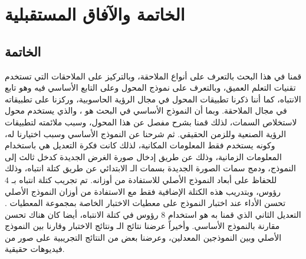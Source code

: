 \chapter{الخاتمة والآفاق المستقبلية}
\section{الخاتمة}
قمنا في هذا البحث بالتعرف على أنواع الملاحقة، وبالتركيز على الملاحقات التي تستخدم تقنيات التعلم العميق، وبالتعرف على نموذج المحول وعلى التابع الأساسي فيه وهو تابع الانتباه، كما أننا ذكرنا تطبيقات المحول في مجال الرؤية الحاسوبية، وركزنا على تطبيقاته في مجال الملاحقة.
وبما أن النموذج الأساسي في البحث هو 
،
والذي يستخدم محول 
لاستخلاص السمات، لذلك قمنا بشرح مفصل عن هذا المحول، وسبب ملائمته لتطبيقات الرؤية الصنعية وللزمن الحقيقي.
ثم شرحنا عن النموذج الأساسي
وسبب اختيارنا له، وكونه يستخدم فقط المعلومات المكانية، لذلك كانت فكرة التعديل هي باستخدام المعلومات الزمانية، وذلك عن طريق إدخال صورة الغرض الجديدة 
كدخل ثالث إلى النموذج، ودمج سمات الصورة الجديدة بسمات الـ
الابتدائي عن طريق كتلة انتباه، وذلك للحفاظ على أبعاد النموذج الأصلي للاستفادة من أوزانه.
تم تجريب كتلة انتباه بـ
$4$
رؤوس، وبتدريب هذه الكتلة الإضافية فقط مع الاستفادة من أوزان النموذج الأصلي تحسن الأداء عند اختبار النموذج على معطيات الاختبار الخاصة بمجموعة المعطيات
.
التعديل الثاني الذي قمنا به هو استخدام $8$ رؤوس في كتلة الانتباه، أيضا كان هناك تحسن مقارنة بالنموذج الأساسي.
وأخيراً عرضنا نتائج الـ
ونتائج الاختبار وقارنا بين النموذج الأصلي وبين النموذجين المعدلين، وعرضنا بعض من النتائج التجريبية على صور من فيديوهات حقيقية.
